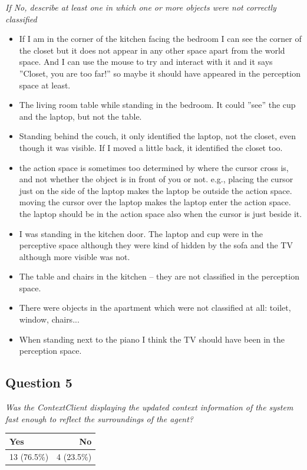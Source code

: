 \emph{If No, describe at least one in which one or more objects were not correctly classified}
\begin{itemize}
	\item If I am in the corner of the kitchen facing the bedroom I can see the corner of the closet but it does not appear in any other space apart from the world space. And I can use the mouse to try and interact with it and it says ''Closet, you are too far!'' so maybe it should have appeared in the perception space at least.
	\item The living room table while standing in the bedroom. It could ''see'' the cup and the laptop, but not the table.
	\item Standing behind the couch, it only identified the laptop, not the closet, even though it was visible. If I moved a little back, it identified the closet too.
	\item the action space is sometimes too determined by where the cursor cross is, and not whether the object is in front of you or not. e.g., placing the cursor just on the side of the laptop makes the laptop be outside the action space. moving the cursor over the laptop makes the laptop enter the action space. the laptop should be in the action space also when the cursor is just beside it.
	\item I was standing in the kitchen door. The laptop and cup were in the perceptive space although they were kind of hidden by the sofa and the TV although more visible was not.
	\item The table and chairs in the kitchen -- they are not classified in the perception space.
	\item There were objects in the apartment which were not classified at all: toilet, window, chairs... 
	\item When standing next to the piano I think the TV should have been in the perception space.

\end{itemize}

\subsection{Question 5}
\emph{Was the ContextClient displaying the updated context information of the system fast enough to reflect the surroundings of the agent?}
\begin{table}[H]
	\begin{center}
		\small \begin{tabular*}{0.35\columnwidth}{lr}
			\\ \hline \hline
			Yes & No \\ \hline \hline

		 	13 (76.5\%) & 4 (23.5\%)\\ \hline
		\end{tabular*}
	\end{center}
\end{table}


